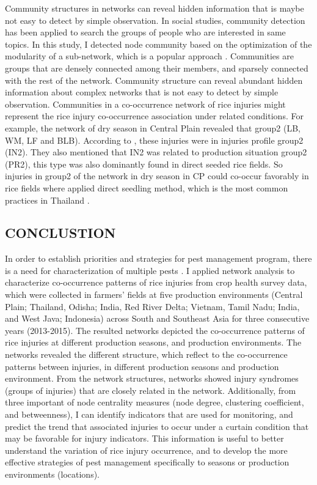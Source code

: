 Community structures in networks can reveal hidden information that is maybe not easy to detect by simple observation. In social studies, community detection has been applied to search the groups of people who are interested in same topics.   In this study, I detected node community based on the optimization of the modularity of a sub-network, which is a popular approach \citep{Liu_2014_Detecting}. Communities are groups that are densely connected among their members, and sparsely connected with the rest of the network. Community structure can reveal abundant hidden information about complex networks that is not easy to detect by simple observation. Communities in a co-occurrence network of rice injuries might represent the rice injury co-occurrence association under related conditions. For example, the network of dry season in Central Plain revealed that group2 (LB, WM, LF and BLB).  According to \citet{Savary_2000_Characterization}, these injuries were in injuries profile group2 (IN2). They also mentioned that IN2 was related to production situation group2 (PR2), this type was also dominantly found in direct seeded rice fields. So injuries in group2 of the network in dry season in CP could co-occur favorably in rice fields where applied direct seedling method, which is the most common practices in Thailand \citep{IRRI_2013_Rice}. 
\newpage
\subsection{CONCLUSTION}

In order to establish priorities and strategies for pest management program, there is a need for characterization of multiple pests \citep{Mew_2004_Looking}. I applied network analysis to characterize co-occurrence patterns of rice injuries from crop health survey data, which were collected in farmers’ fields at five production environments (Central Plain; Thailand, Odisha; India, Red River Delta; Vietnam, Tamil Nadu; India, and West Java; Indonesia) across South and Southeast Asia for three consecutive years (2013-2015). The resulted networks depicted the co-occurrence patterns of rice injuries at different production seasons, and production environments. The networks revealed the different structure, which reflect to the co-occurrence patterns between injuries, in different production seasons and production environment. From the network structures, networks showed injury syndromes (groups of injuries) that are closely related in the network. Additionally, from three important of node centrality measures (node degree, clustering coefficient, and betweenness), I can identify indicators that are used for monitoring, and predict the trend that associated injuries to occur under a curtain condition that may be favorable for injury indicators. This information is useful to better understand the variation of rice injury occurrence, and to develop the more effective strategies of pest management specifically to seasons or production environments (locations).

